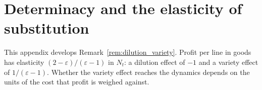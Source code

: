 \documentclass[authoryear, review, 12pt]{elsarticle}
\begin{document}
	\section{Determinacy and the elasticity of substitution}\label{app:determinacy}

This appendix develops Remark~\ref{rem:dilution_variety}. Profit per line in goods has
elasticity $(2-\varepsilon)/(\varepsilon-1)$ in $N_t$: a dilution effect of $-1$ and a
variety effect of $1/(\varepsilon-1)$. Whether the variety effect reaches the dynamics depends
on the units of the cost that profit is weighed against.
\end{document}
